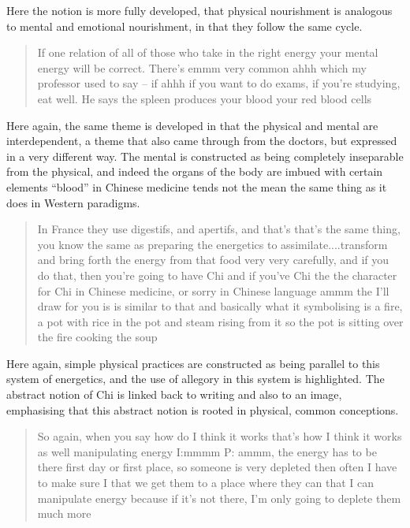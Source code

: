 Here the notion is more fully developed, that physical nourishment is analogous to mental and emotional nourishment, in that they follow the same cycle. 


\begin{quotation}
  If one relation of all of those who take in the right energy your mental energy will be correct. There's emmm very common ahhh which my professor used to say – if ahhh if you want to do exams, if you're studying, eat well. He says the spleen produces your blood your red blood cells 

\end{quotation}

Here again, the same theme is developed in that the physical and mental are interdependent, a theme that also came through from the doctors, but expressed in a very different way. The mental is constructed as being completely inseparable from the physical, and indeed the organs of the body are imbued with certain elements ``blood'' in Chinese medicine tends not the mean the same thing as it does in Western paradigms. 

\begin{quotation}
   In France they use digestifs, and apertifs, and that's that's the same thing, you know the same as preparing the energetics to assimilate....transform and bring forth the energy from that food very very carefully, and if you do that, then you're going to have Chi and if you've Chi the the character for Chi in Chinese medicine, or sorry in Chinese language ammm the I'll draw for you is is similar to that and basically what it symbolising is a fire, a pot with rice in the pot and steam rising from it so the pot is sitting over the fire cooking the soup 

\end{quotation}

Here again, simple physical practices are constructed as being parallel to this system of energetics, and the use of allegory in this system is highlighted. The abstract notion of Chi is linked back to writing and also to an image, emphasising that this abstract notion is rooted in physical, common conceptions. 


\begin{quotation}
  So again, when you say how do I think it works that's how I think it works as well manipulating energy
I:mmmm
P: ammm, the energy has to be there first day or first place, so someone is very depleted then often I have to make sure I that we get them to a place where they can that I can manipulate energy because if it's not there, I'm only going to deplete them much more


\end{quotation}

